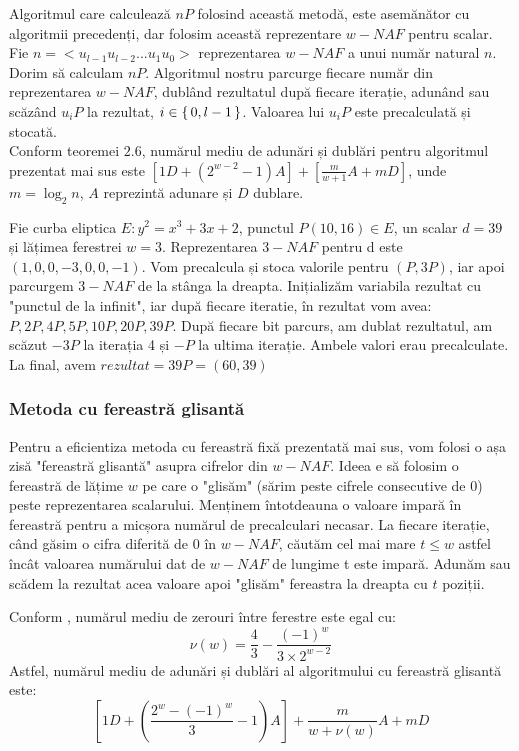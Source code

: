 Algoritmul care calculează $nP$ folosind această metodă, este asemănător cu algoritmii precedenți, dar folosim această reprezentare $w-NAF$ pentru scalar. Fie $n = <u_{l-1}u_{l-2}...u_1u_0>$ reprezentarea $w-NAF$ a unui număr natural $n$. Dorim să calculam $nP$. Algoritmul nostru parcurge fiecare număr din reprezentarea $w-NAF$, dublând rezultatul după fiecare iterație, adunând sau scăzând $u_iP$ la rezultat, $i\in \set{0, l-1}$. Valoarea lui $u_iP$ este precalculată și stocată. \\

Conform teoremei $2.6$, numărul mediu de adunări și dublări pentru algoritmul prezentat mai sus este $[1D + (2^{w-2} - 1) A] + [\frac{m}{w+1}A + mD]$, unde $m = \log_2 n$, $A$ reprezintă adunare și $D$ dublare. \cite{windowCost}

\begin{ex}
Fie curba eliptica $E: y^2 = x^3 + 3x + 2$, punctul $P(10, 16)\in E$, un scalar $d = 39$ și lățimea ferestrei $w=3$. Reprezentarea $3-NAF$ pentru d este $(1, 0, 0, -3, 0, 0, -1)$. Vom precalcula și stoca valorile pentru $(P, 3P)$, iar apoi parcurgem $3-NAF$ de la stânga la dreapta. Inițializăm variabila rezultat cu "punctul de la infinit", iar după fiecare iteratie, în rezultat vom avea: $P, 2P, 4P, 5P, 10P, 20P, 39P$. După fiecare bit parcurs, am dublat rezultatul, am scăzut $-3P$ la iterația 4 și $-P$ la ultima iterație. Ambele valori erau precalculate. La final, avem $rezultat = 39P = (60, 39)$
\end{ex}

\subsubsection{Metoda cu fereastră glisantă}

    Pentru a eficientiza metoda cu fereastră fixă prezentată mai sus, vom folosi o așa zisă "fereastră glisantă" asupra cifrelor din $w-NAF$. Ideea e să folosim o fereastră de lățime $w$ pe care o "glisăm" (sărim peste cifrele consecutive de $0$) peste reprezentarea scalarului. Menținem întotdeauna o valoare impară în fereastră pentru a micșora numărul de precalculari necasar. La fiecare iterație, când găsim o cifra diferită de $0$ în $w-NAF$, căutăm cel mai mare $t \leq w$ astfel încât valoarea numărului dat de $w-NAF$ de lungime t este impară. Adunăm sau scădem la rezultat acea valoare apoi "glisăm" fereastra la dreapta cu $t$ poziții.
\begin{obs}
Conform \cite{slidingCost}, numărul mediu de zerouri între ferestre este egal cu:
$$\nu(w) = \frac{4}{3} - \frac{(-1)^w}{3\times 2^{w-2}}$$
Astfel, numărul mediu de adunări și dublări al algoritmului cu fereastră glisantă este:
$$[1D + (\frac{2^w - (-1)^w}{3} - 1)A] + \frac{m}{w + \nu(w)}A + mD$$
\end{obs}

